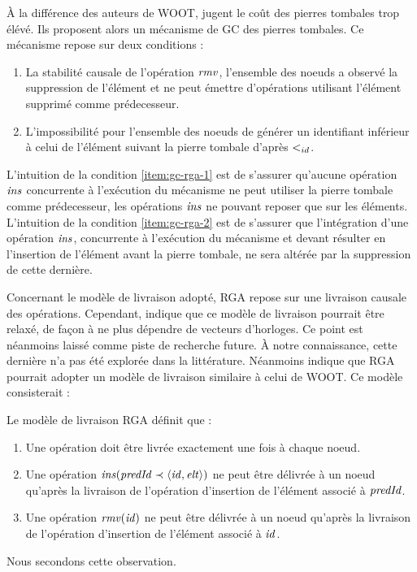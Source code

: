 À la différence des auteurs de WOOT, \textcite{ROH2011354} jugent le coût des pierres tombales trop élévé.
Ils proposent alors un mécanisme de \ac{GC} des pierres tombales.
Ce mécanisme repose sur deux conditions :
\begin{enumerate}
  \item \label{item:gc-rga-1}
    La stabilité causale de l'opération $\mathit{rmv}$, \ie l'ensemble des noeuds a observé la suppression de l'élément et ne peut émettre d'opérations utilisant l'élément supprimé comme prédecesseur.
  \item \label{item:gc-rga-2}
    L'impossibilité pour l'ensemble des noeuds de générer un identifiant inférieur à celui de l'élément suivant la pierre tombale d'après $<_{id}$.
\end{enumerate}
L'intuition de la condition \ref{item:gc-rga-1} est de s'assurer qu'aucune opération $\mathit{ins}$ concurrente à l'exécution du mécanisme ne peut utiliser la pierre tombale comme prédecesseur, les opérations $\mathit{ins}$ ne pouvant reposer que sur les éléments.
L'intuition de la condition \ref{item:gc-rga-2} est de s'assurer que l'intégration d'une opération $\mathit{ins}$, concurrente à l'exécution du mécanisme et devant résulter en l'insertion de l'élément avant la pierre tombale, ne sera altérée par la suppression de cette dernière.

Concernant le modèle de livraison adopté, \ac{RGA} repose sur une livraison causale des opérations.
Cependant, \cite{ROH2011354} indique que ce modèle de livraison pourrait être relaxé, de façon à ne plus dépendre de vecteurs d'horloges.
Ce point est néanmoins laissé comme piste de recherche future.
À notre connaissance, cette dernière n'a pas été explorée dans la littérature.
Néanmoins \textcite{2021-these-vic} indique que \ac{RGA} pourrait adopter un modèle de livraison similaire à celui de WOOT.
Ce modèle consisterait :
\begin{definition}
  Le modèle de livraison \ac{RGA} définit que :
  \begin{enumerate}
    \item Une opération doit être livrée exactement une fois à chaque noeud.
    \item Une opération $\mathit{ins}(\mathit{predId} \prec \langle \mathit{id},\mathit{elt} \rangle)$ ne peut être délivrée à un noeud qu'après la livraison de l'opération d'insertion de l'élément associé à $\mathit{predId}$.
    \item Une opération $\mathit{rmv}(\mathit{id})$ ne peut être délivrée à un noeud qu'après la livraison de l'opération d'insertion de l'élément associé à $\mathit{id}$.
  \end{enumerate}
\end{definition}
Nous secondons cette observation.

